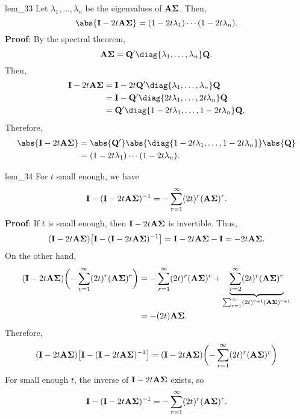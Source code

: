 \begin{Lemma}{}{lem_33}
    Let $ \lambda_1,\ldots,\lambda_n $ be the eigenvalues of $ \mathbf{A \Sigma} $. Then,
    \[ \abs{\Matrix{I}-2t \Matrix{A\Sigma}}=(1-2t\lambda_1)\cdots(1-2t\lambda_n). \]
    \tcblower{}
    \textbf{Proof}:
    By the spectral theorem,
    \[ \Matrix{A\Sigma}=\Matrix{Q}'\diag{\lambda_1,\ldots,\lambda_n}\Matrix{Q}. \]
    Then,
    \begin{align*}
        \Matrix{I}-2t \Matrix{A\Sigma}
         & =\Matrix{I}-2t \Matrix{Q}'\diag{\lambda_1,\ldots,\lambda_n}\Matrix{Q}  \\
         & =\Matrix{I}-\Matrix{Q}'\diag{2t\lambda_1,\ldots,2t\lambda_n}\Matrix{Q} \\
         & =\Matrix{Q}'\diag{1-2t\lambda_1,\ldots,1-2t\lambda_n}\Matrix{Q}.
    \end{align*}
    Therefore,
    \begin{align*}
        \abs{\Matrix{I}-2t \Matrix{A\Sigma}}
         & =\abs{\Matrix{Q}'}\abs{\diag{1-2t\lambda_1,\ldots,1-2t\lambda_n}}\abs{\Matrix{Q}} \\
         & =(1-2t\lambda_1)\cdots(1-2t\lambda_n).
    \end{align*}
\end{Lemma}
\begin{Lemma}{}{lem_34}
    For $ t $ small enough, we have
    \[ \mathbf{I}-(\mathbf{I}-2t \mathbf{A\Sigma})^{-1}=-\sum_{r=1}^{\infty}(2t)^r(\mathbf{A\Sigma})^r. \]
    \tcblower{}
    \textbf{Proof}:
    If $ t $ is small enough, then $ \mathbf{I}-2t \mathbf{A\Sigma} $ is invertible. Thus,
    \[ (\mathbf{I}-2t \mathbf{A\Sigma})\bigl[\mathbf{I}-(\mathbf{I}-2t \mathbf{A\Sigma})^{-1}\bigr]
        =\mathbf{I}-2t \mathbf{A\Sigma}-\mathbf{I}
        =-2t \mathbf{A\Sigma}. \]
    On the other hand,
    \begin{align*}
        (\mathbf{I}-2t \mathbf{A\Sigma})\biggl(-\sum_{r=1}^{\infty}(2t)^r(\mathbf{A\Sigma})^r\biggr)
         & =-\sum_{r=1}^{\infty}(2t)^r(\mathbf{A\Sigma})^r+\underbrace{\sum_{r=2}^{\infty}(2t)^r(\mathbf{A\Sigma})^r}_{\sum_{r=1}^{\infty}(2t)^{r+1}(\mathbf{A\Sigma})^{r+1}} \\
         & =-(2t)\mathbf{A\Sigma}.
    \end{align*}
    Therefore,
    \[ (\mathbf{I}-2t \mathbf{A\Sigma})\bigl[\mathbf{I}-(\mathbf{I}-2t \mathbf{A\Sigma})^{-1}\bigr]=
        (\mathbf{I}-2t \mathbf{A\Sigma})\biggl(-\sum_{r=1}^{\infty}(2t)^r(\mathbf{A\Sigma})^r\biggr) \]
    For small enough $ t $, the inverse of $ \mathbf{I}-2t \mathbf{A\Sigma} $ exists, so
    \[ \mathbf{I}-(\mathbf{I}-2t \mathbf{A\Sigma})^{-1}=-\sum_{r=1}^{\infty}(2t)^r(\mathbf{A\Sigma})^r. \]
\end{Lemma}
